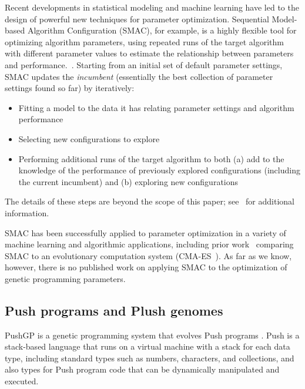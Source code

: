 
Recent developments in statistical modeling and machine learning have
led to the design of powerful new techniques for parameter optimization. 
Sequential Model-based Algorithm Configuration (SMAC), for example, is a
highly flexible tool for optimizing algorithm parameters, using repeated runs
of the target algorithm with different parameter values to estimate
the relationship between parameters and performance.~\cite{HutHooLey11-SMAC}. Starting from an initial set of default
parameter settings, SMAC updates the \emph{incumbent} (essentially the
best collection of parameter settings found so far) by iteratively:
\begin{itemize}
	\item Fitting a model to the data it has relating parameter settings and algorithm performance
	\item Selecting new configurations to explore
	\item Performing additional runs of the target algorithm to both (a)
	add to the knowledge of the performance of previously explored
	configurations (including the current incumbent) and
	(b) exploring new configurations
\end{itemize}
The details of these steps are beyond the scope of this paper; 
see~\cite{HutHooLey11-SMAC} for additional information. 

SMAC has been successfully applied to parameter
optimization in a variety of machine learning and algorithmic 
applications, including prior 
work~\cite{hutter2013evaluation} comparing SMAC to an
evolutionary computation system (CMA-ES~\cite{hansen1996adapting}).
As far as we know, however, there is no published work on applying SMAC to
the optimization of genetic programming parameters.

\subsection{Push programs and Plush genomes}
\label{sec:PushGPBackground}

PushGP is a genetic programming system that evolves Push programs 
\cite{spector2:2001:gecco,spector:2002:GPEM,push3gecco,Helmuth:2015:dissertation}. 
Push is a stack-based language that runs on a virtual machine with a stack for 
each data type, including standard types such as numbers, characters, and 
collections, and also types for Push program code that can be dynamically 
manipulated and executed. 

